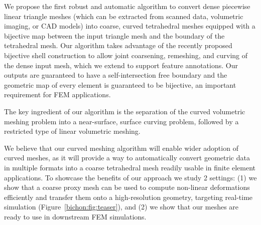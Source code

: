 We propose the first robust and automatic algorithm to convert dense piecewise linear triangle meshes (which can be extracted from scanned data, volumetric imaging, or CAD models) into coarse, curved tetrahedral meshes equipped with a bijective map between the input triangle mesh and the boundary of the tetrahedral mesh. Our algorithm takes advantage of the recently proposed bijective shell construction \cite{jiang2020bijective} to allow joint coarsening, remeshing, and curving of the dense input mesh, which we extend to support feature annotations.
Our outputs are guaranteed to have a self-intersection free boundary and the geometric map of every element is guaranteed to be bijective, an important requirement for FEM applications.

The key ingredient of our algorithm is the separation of the curved volumetric meshing problem into a near-surface, surface curving problem, followed by a restricted type of linear volumetric meshing. 



We believe that our curved meshing algorithm will enable wider adoption of curved meshes, as it will provide a way to automatically convert geometric data in multiple formats into a coarse tetrahedral mesh readily usable in finite element applications. To showcase the benefits of our approach we study 2 settings: (1) we show that a coarse proxy mesh can be used to compute non-linear deformations efficiently and transfer them onto a high-resolution geometry, targeting real-time simulation (Figure~\ref{bichon:fig:teaser}), and (2) 
we show that our meshes are ready to use in downstream FEM simulations.


